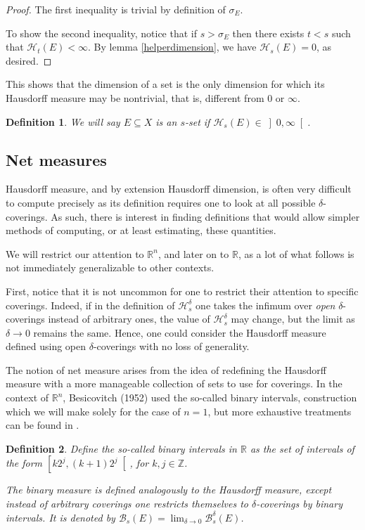 \documentclass[11pt]{amsart}
\newcommand{\R}{\mathbb{R}}
\newcommand{\Z}{\mathbb{Z}}
\newcommand{\HH}{\mathcal{H}}
\newcommand{\BB}{\mathcal{B}}
\newtheorem{definition}{Definition}
\begin{document}
\begin{proof}
The first inequality is trivial by definition of $\sigma_E$.

To show the second inequality, notice that if $s > \sigma_E$ then there exists $t < s$ such that $\HH_t(E) < \infty$. By lemma \ref{helperdimension}, we have $\HH_s(E) = 0$, as desired.
\end{proof}

This shows that the dimension of a set is the only dimension for which its Hausdorff measure may be nontrivial, that is, different from $0$ or $\infty$.

\begin{definition}
We will say $E \subseteq X$ is an \emph{$s$-set} if $\HH_s(E) \in \left]0, \infty \right[$.
\end{definition}

\subsection{Net measures}

Hausdorff measure, and by extension Hausdorff dimension, is often very difficult to compute precisely as its definition requires one to look at all possible $\delta$-coverings. As such, there is interest in finding definitions that would allow simpler methods of computing, or at least estimating, these quantities.   

We will restrict our attention to $\R^n$, and later on to $\R$, as a lot of what follows is not immediately generalizable to other contexts.

First, notice that it is not uncommon for one to restrict their attention to specific coverings. Indeed, if in the definition of $\HH_s^\delta$ one takes the infimum over \emph{open} $\delta$-coverings instead of arbitrary ones, the value of $\HH_s^\delta$ may change, but the limit as $\delta \to 0$ remains the same. Hence, one could consider the Hausdorff measure defined using open $\delta$-coverings with no loss of generality.

The notion of net measure arises from the idea of redefining the Hausdorff measure with a more manageable collection of sets to use for coverings. In the context of $\R^n$, Besicovitch (1952) used the so-called binary intervals, construction which we will make solely for the case of $n = 1$, but more exhaustive treatments can be found in \cite{falconer} \cite{rogers}.

\begin{definition}
Define the so-called \emph{binary intervals} in $\R$ as the set of intervals of the form $\left[ k 2^j, (k+1) 2^j \right[$, for $k, j \in \Z$.

The binary measure is defined analogously to the Hausdorff measure, except instead of arbitrary coverings one restricts themselves to $\delta$-coverings by binary intervals. It is denoted by $\BB_s(E) = \lim_{\delta \to 0} \BB_s^\delta(E)$.
\end{definition}
\end{document}
